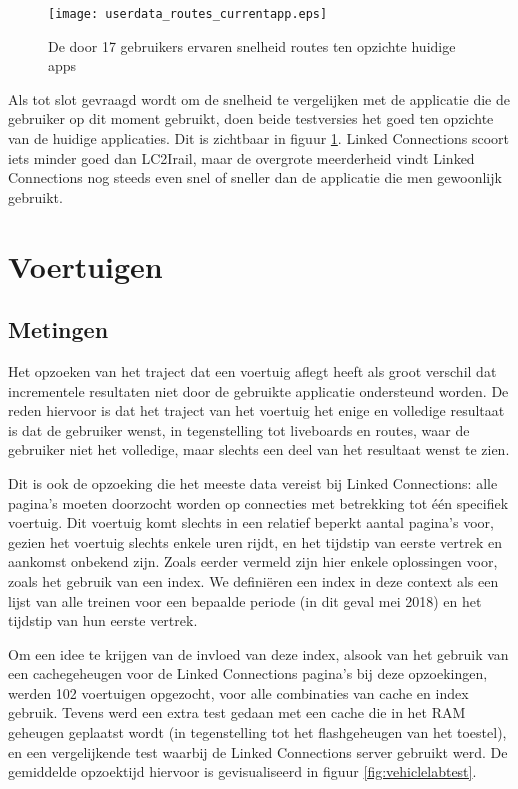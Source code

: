 \begin{figure}[ht]
	\centering
	\texttt{[image: userdata\_routes\_currentapp.eps]}
	\caption[Door gebruikers ervaren snelheid routes tov huidige apps]{De door 17 gebruikers ervaren snelheid routes ten opzichte huidige apps }
	\label{fig:relativePerceptionRoutes}
\end{figure}

Als tot slot gevraagd wordt om de snelheid te vergelijken met de applicatie die de gebruiker op dit moment gebruikt, doen beide testversies het goed ten opzichte van de huidige applicaties. Dit is zichtbaar in figuur \ref{fig:relativePerceptionRoutes}. Linked Connections scoort iets minder goed dan LC2Irail, maar de overgrote meerderheid vindt Linked Connections nog steeds even snel of sneller dan de applicatie die men gewoonlijk gebruikt.

\section{Voertuigen}

\subsection{Metingen}
Het opzoeken van het traject dat een voertuig aflegt heeft als groot verschil dat incrementele resultaten niet door de gebruikte applicatie ondersteund worden. De reden hiervoor is dat het traject van het voertuig het enige en volledige resultaat is dat de gebruiker wenst, in tegenstelling tot liveboards en routes, waar de gebruiker niet het volledige, maar slechts een deel van het resultaat wenst te zien. 

Dit is ook de opzoeking die het meeste data vereist bij Linked Connections: alle pagina's moeten doorzocht worden op connecties met betrekking tot één specifiek voertuig. Dit voertuig komt slechts in een relatief beperkt aantal pagina's voor, gezien het voertuig slechts enkele uren rijdt, en het tijdstip van eerste vertrek en aankomst onbekend zijn. Zoals eerder vermeld %
zijn hier enkele oplossingen voor, zoals het gebruik van een index. We definiëren een index in deze context als een lijst van alle treinen voor een bepaalde periode (in dit geval mei 2018) en het tijdstip van hun eerste vertrek.

Om een idee te krijgen van de invloed van deze index, alsook van het gebruik van een cachegeheugen voor de Linked Connections pagina's bij deze opzoekingen, werden 102 voertuigen opgezocht, voor alle combinaties van cache en index gebruik. Tevens werd een extra test gedaan met een cache die in het RAM geheugen geplaatst wordt (in tegenstelling tot het flashgeheugen van het toestel), en een vergelijkende test waarbij de Linked Connections server gebruikt werd. De gemiddelde opzoektijd hiervoor is gevisualiseerd in figuur \ref{fig:vehiclelabtest}.

